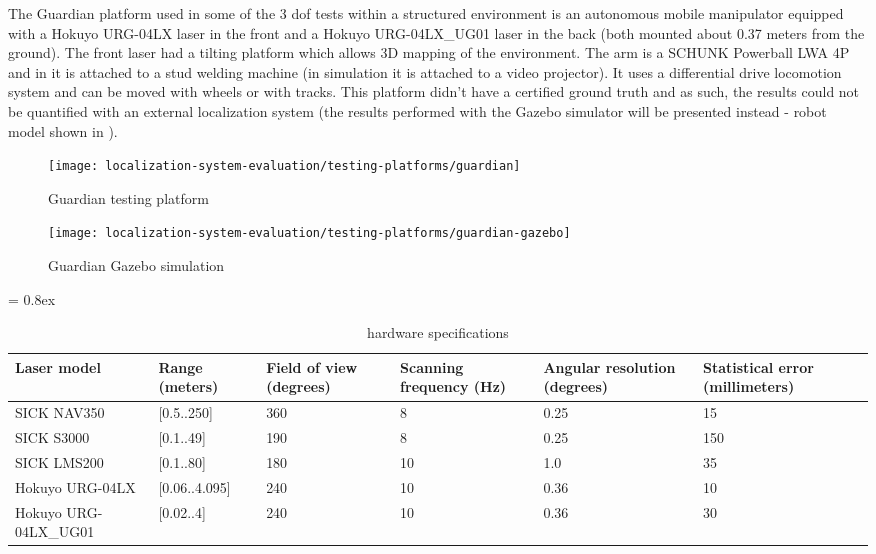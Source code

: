 The Guardian platform used in some of the 3 \gls{dof} tests within a structured environment is an autonomous mobile manipulator equipped with a Hokuyo URG-04LX laser in the front and a Hokuyo URG-04LX\_UG01 laser in the back (both mounted about 0.37 meters from the ground). The front laser had a tilting platform which allows 3D mapping of the environment. The arm is a SCHUNK Powerball LWA 4P and in  it is attached to a stud welding machine (in simulation it is attached to a video projector). It uses a differential drive locomotion system and can be moved with wheels or with tracks. This platform didn't have a certified ground truth and as such, the results could not be quantified with an external localization system (the results performed with the Gazebo simulator will be presented instead - robot model shown in ).

\begin{figure}[H]
	\centering
	\begin{minipage}[b]{0.24\textwidth}
		\centering
		\texttt{[image: localization-system-evaluation/testing-platforms/guardian]}
		\caption{Guardian testing platform}
		\label{fig:localization-system-evaluation_guardian}
	\end{minipage}\hfill
	\begin{minipage}[b]{0.24\textwidth}
		\centering
		\texttt{[image: localization-system-evaluation/testing-platforms/guardian-gazebo]}
		\caption{Guardian Gazebo simulation}
		\label{fig:localization-system-evaluation_guardian_gazebo}
	\end{minipage}
\end{figure}


\begin{table*}[t]
	\caption{ hardware specifications}
	\tabulinesep = 0.8ex
	\centering
	\small
	\begin{tabu} { X[2.5,m,c] | X[m,c] X[m,c] X[m,c] X[m,c] X[m,c] }
		\rowfont{\bfseries\itshape\small} Laser model & Range (meters) & Field of view (degrees) & Scanning frequency (Hz) & Angular resolution (degrees) & Statistical error (millimeters) \\
		\hline
		{\small SICK NAV350} 			& [0.5..250] 	& 360 	& 8 	& 0.25 	& 15 	\\
		{\small SICK S3000} 			& [0.1..49] 	& 190 	& 8 	& 0.25 	& 150 	\\
		{\small SICK LMS200} 			& [0.1..80] 	& 180 	& 10 	& 1.0 	& 35 	\\
		{\small Hokuyo URG-04LX} 		& [0.06..4.095] & 240 	& 10 	& 0.36 	& 10 	\\
		{\small Hokuyo URG-04LX\_UG01} 	& [0.02..4] 	& 240 	& 10 	& 0.36 	& 30 	\\
	\end{tabu}
	\label{tab:localization-system-evaluation_laser-hardware-specifications}
\end{table*}



